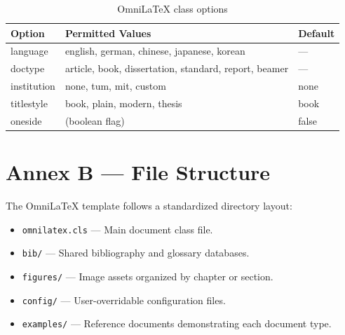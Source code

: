 \documentclass[
    language=english,
    doctype=standard,
    institution=none,
    titlestyle=book,
    oneside,
]{../../omnilatex}
\begin{document}
\begin{table}[htbp]
\centering
\caption{OmniLaTeX class options}\label{tab:options}
\begin{tabular}{lll}
\toprule
\textbf{Option} & \textbf{Permitted Values} & \textbf{Default} \\
\midrule
language    & english, german, chinese, japanese, korean & --- \\
doctype     & article, book, dissertation, standard, report, beamer & --- \\
institution & none, tum, mit, custom & none \\
titlestyle  & book, plain, modern, thesis & book \\
oneside     & (boolean flag) & false \\
\bottomrule
\end{tabular}
\end{table}

\section{Annex B --- File Structure}

The OmniLaTeX template follows a standardized directory layout:
\begin{itemize}
    \item \texttt{omnilatex.cls} --- Main document class file.
    \item \texttt{bib/} --- Shared bibliography and glossary databases.
    \item \texttt{figures/} --- Image assets organized by chapter or section.
    \item \texttt{config/} --- User-overridable configuration files.
    \item \texttt{examples/} --- Reference documents demonstrating each document type.
\end{itemize}
\end{document}
